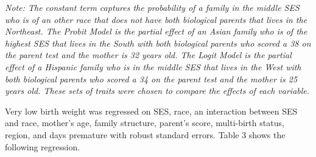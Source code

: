 \documentclass{article}
\begin{document}
\begin{table}[H]
\begin{threeparttable}
\begin{tablenotes}[flushleft]
      \small
      \singlespace
      \item
      \textit{{\footnotesize{{Note}: The constant term captures the probability of a family in the middle SES who is of an other race that does not have both biological parents that lives in the Northeast. The Probit Model is the partial effect of an Asian family who is of the highest SES that lives in the South with both biological parents who scored a 38 on the parent test and the mother is 32 years old. The Logit Model is the partial effect of a Hispanic family who is in the middle SES that lives in the West with both biological parents who scored a 34 on the parent test and the mother is 25 years old. These sets of traits were chosen to compare the effects of each variable.}}}   
      
\end{tablenotes}		

\end{threeparttable}

\end{table}

Very low birth weight was regressed on SES, race, an interaction between SES and race, mother's age, family structure, parent's score, multi-birth status, region, and days premature with robust standard errors. Table 3 shows the following regression. 
\end{document}
